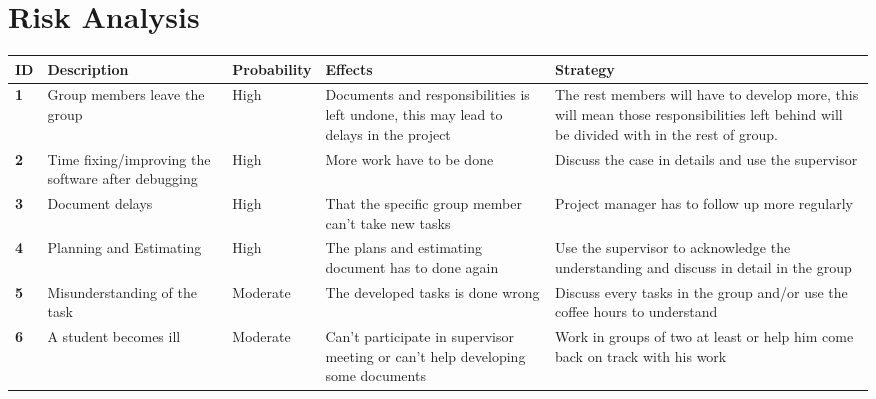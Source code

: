 \renewcommand{\headrulewidth}{0.1pt}
\renewcommand{\footrulewidth}{0.1pt}

\section*{Risk Analysis}

\begin{center}
	\def\arraystretch{1.5}%
    \begin{tabular}{ | l | p{4cm} | l | p{4cm} | p{4cm} |}
    \hline
    	\textbf{ID} & \textbf{Description} & \textbf{Probability} & \textbf{Effects} & \textbf{Strategy} \\ \hline
		
		\textbf{1} & Group members leave the group & High & Documents and responsibilities is left undone, this may lead to delays in the project & The rest members will have to develop more, this will mean those responsibilities left behind will be divided with in the rest of group. \\ \hline
		\textbf{2} & Time fixing/improving the software after debugging & High & More work have to be done & Discuss the case in details and use the supervisor \\ \hline
		
		\textbf{3} & Document delays & High & That the specific group member can’t take new tasks & Project manager has to follow up more regularly \\ \hline
		
		\textbf{4} & Planning and Estimating & High & The plans and estimating document has to done again & Use the supervisor to acknowledge the understanding and discuss in detail in the group \\ \hline
		
		\textbf{5} & Misunderstanding of the task & Moderate & The developed tasks is done wrong & Discuss every tasks in the group and/or use the coffee hours to understand \\ \hline
		
		\textbf{6} & A student becomes ill & Moderate & Can’t participate in supervisor meeting or can’t help developing some documents & Work in groups of two at least or help him come back on track with his work \\ \hline
		

\end{tabular}
\end{center}
